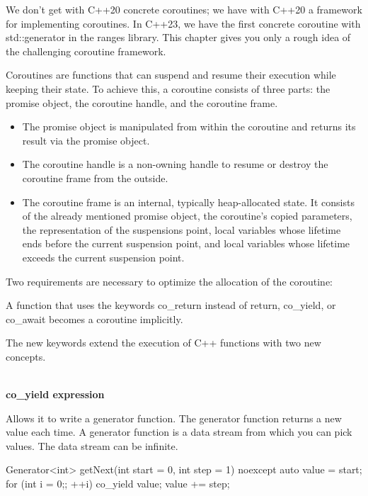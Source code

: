 
We don’t get with C++20 concrete coroutines; we have with C++20 a framework for implementing coroutines. In C++23, we have the first concrete coroutine with std::generator in the ranges library. This chapter gives you only a rough idea of the challenging coroutine framework.

Coroutines are functions that can suspend and resume their execution while keeping their state. To achieve this, a coroutine consists of three parts: the promise object, the coroutine handle, and the coroutine frame.

\begin{itemize}
\item 
The promise object is manipulated from within the coroutine and returns its result via the promise object.

\item 
The coroutine handle is a non-owning handle to resume or destroy the coroutine frame from the outside.

\item 
The coroutine frame is an internal, typically heap-allocated state. It consists of the already mentioned promise object, the coroutine’s copied parameters, the representation of the suspensions point, local variables whose lifetime ends before the current suspension point, and local variables whose lifetime exceeds the current suspension point.
\end{itemize}

Two requirements are necessary to optimize the allocation of the coroutine: 

A function that uses the keywords co\_return instead of return, co\_yield, or co\_await becomes a coroutine implicitly.

The new keywords extend the execution of C++ functions with two new concepts.

\noindent
\\\textbf{co\_yield expression}

Allows it to write a generator function. The generator function returns a new value each time. A generator function is a data stream from which you can pick values. The data stream can be infinite.


\begin{cpp}
Generator<int> getNext(int start = 0, int step = 1) noexcept {
	auto value = start;
	for (int i = 0;; ++i){
		co_yield value;
		value += step;
	}
}
\end{cpp}


